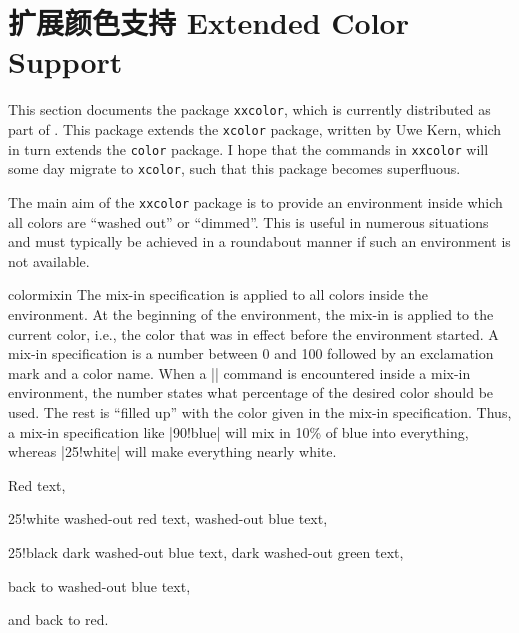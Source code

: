 %
%
%


\section{扩展颜色支持 Extended Color Support}

This section documents the package \texttt{xxcolor}, which is currently
distributed as part of \pgfname. This package extends the \texttt{xcolor}
package, written by Uwe Kern, which in turn extends the \texttt{color} package.
I hope that the commands in \texttt{xxcolor} will some day migrate to
\texttt{xcolor}, such that this package becomes superfluous.

The main aim of the \texttt{xxcolor} package is to provide an environment
inside which all colors are ``washed out'' or ``dimmed''. This is useful in
numerous situations and must typically be achieved in a roundabout manner if
such an environment is not available.

\begin{environment}{{colormixin}}
    The mix-in specification is applied to all colors inside the environment.
    At the beginning of the environment, the mix-in is applied to the current
    color, i.e., the color that was in effect before the environment started.
    A mix-in specification is a number between 0 and 100 followed by an
    exclamation mark and a color name. When a |\color| command is encountered
    inside a mix-in environment, the number states what percentage of the
    desired color should be used. The rest is ``filled up'' with the color
    given in the mix-in specification. Thus, a mix-in specification like
    |90!blue| will mix in 10\% of blue into everything, whereas |25!white| will
    make everything nearly white.
\begin{codeexample}[width=4cm,preamble={\usepackage{xxcolor}}]
\begin{minipage}{3.5cm}\raggedright
\color{red}Red text,%
\begin{colormixin}{25!white}
  washed-out red text,
  \color{blue} washed-out blue text,
  \begin{colormixin}{25!black}
    dark washed-out blue text,
    \color{green} dark washed-out green text,%
  \end{colormixin}
  back to washed-out blue text,%
\end{colormixin}
and back to red.
\end{minipage}%
\end{codeexample}
\end{environment}

